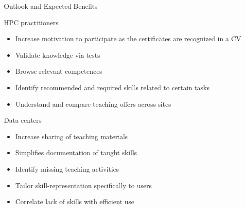 \documentclass[compress,aspectratio=169]{beamer}
\begin{document}
\begin{frame}{Outlook and Expected Benefits}
	\begin{block}{HPC practitioners}
		\vspace*{-0.2cm}
	\begin{itemize}
	\item Increase motivation to participate as the certificates are recognized in a CV
	\item Validate knowledge via tests
	\item Browse relevant competences
	\item Identify recommended and required skills related to certain tasks
	\item Understand and compare teaching offers across sites
	\end{itemize}
	\end{block}
	\vspace*{-0.3cm}
	\begin{block}{Data centers}
		\vspace*{-0.2cm}
	\begin{itemize}
	\item Increase sharing of teaching materials
	\item Simplifies documentation of taught skills
	\item Identify missing teaching activities
	\item Tailor skill-representation specifically to users
	\item Correlate lack of skills with efficient use
	\end{itemize}
	\end{block}
\end{frame}
\end{document}
